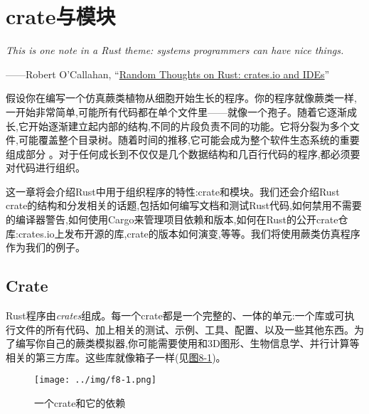 \chapter{crate与模块}\label{ch08}

\emph{This is one note in a Rust theme: systems programmers can have nice things.}

\begin{flushright}
    ——Robert O'Callahan, “\href{https://robert.ocallahan.org/2016/08/random-thoughts-on-rust-cratesio-and.html}{Random Thoughts on Rust: crates.io and IDEs}”
\end{flushright}

假设你在编写一个仿真蕨类植物从细胞开始生长的程序。你的程序就像蕨类一样,一开始非常简单,可能所有代码都在单个文件里——就像一个孢子。随着它逐渐成长,它开始逐渐建立起内部的结构,不同的片段负责不同的功能。它将分裂为多个文件,可能覆盖整个目录树。随着时间的推移,它可能会成为整个软件生态系统的重要组成部分 。对于任何成长到不仅仅是几个数据结构和几百行代码的程序,都必须要对代码进行组织。

这一章将会介绍Rust中用于组织程序的特性:crate和模块。我们还会介绍Rust crate的结构和分发相关的话题,包括如何编写文档和测试Rust代码,如何禁用不需要的编译器警告,如何使用Cargo来管理项目依赖和版本,如何在Rust的公开crate仓库:crates.io上发布开源的库,crate的版本如何演变,等等。我们将使用蕨类仿真程序作为我们的例子。

\section{Crate}

Rust程序由\emph{crates}组成。每一个crate都是一个完整的、一体的单元:一个库或可执行文件的所有代码、加上相关的测试、示例、工具、配置、以及一些其他东西。为了编写你自己的蕨类模拟器,你可能需要使用和3D图形、生物信息学、并行计算等相关的第三方库。这些库就像箱子一样(见\hyperref[f8-1]{图8-1})。

\begin{figure}[htbp]
    \centering
    \texttt{[image: ../img/f8-1.png]}
    \caption{一个crate和它的依赖}
    \label{f8-1}
\end{figure}

